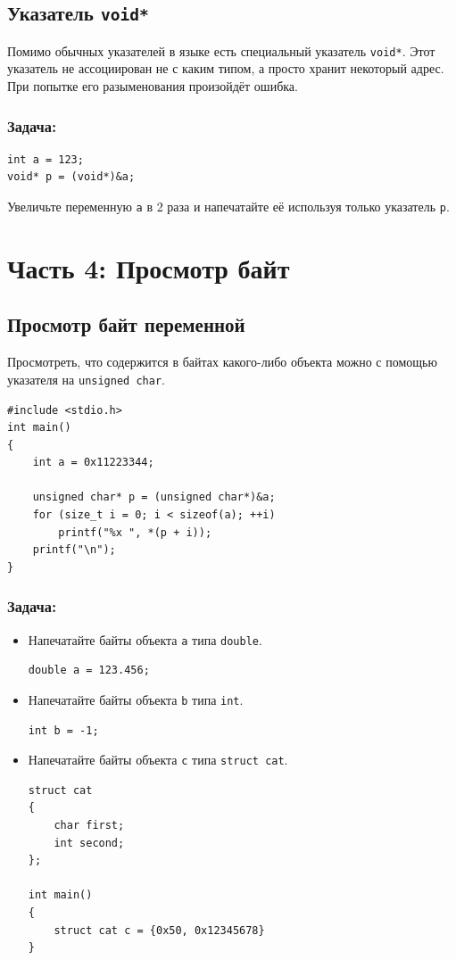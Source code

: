 \documentclass{article}
\begin{document}
\subsection*{Указатель \texttt{void*}}
Помимо обычных указателей в языке есть специальный указатель \texttt{void*}. Этот указатель не ассоциирован не с каким типом, а просто хранит некоторый адрес. При попытке его разыменования произойдёт ошибка.
\subsubsection*{Задача:}
\begin{lstlisting} 
int a = 123;
void* p = (void*)&a;
\end{lstlisting}
Увеличьте переменную \texttt{a} в 2 раза и напечатайте её используя только указатель \texttt{p}.


\newpage

\section*{Часть 4: Просмотр байт}
\subsection*{Просмотр байт переменной}
Просмотреть, что содержится в байтах какого-либо объекта можно с помощью указателя на \texttt{unsigned char}.

\begin{lstlisting} 
#include <stdio.h>
int main() 
{
    int a = 0x11223344;
    
    unsigned char* p = (unsigned char*)&a;
    for (size_t i = 0; i < sizeof(a); ++i)
        printf("%x ", *(p + i));
    printf("\n");
}
\end{lstlisting}

\subsubsection*{Задача:}

\begin{itemize}
\item Напечатайте байты объекта \texttt{a} типа \texttt{double}.
\begin{lstlisting} 
double a = 123.456;
\end{lstlisting}

\item Напечатайте байты объекта \texttt{b} типа \texttt{int}.
\begin{lstlisting} 
int b = -1;
\end{lstlisting}

\item Напечатайте байты объекта \texttt{c} типа \texttt{struct cat}.
\begin{lstlisting} 
struct cat
{
    char first;
    int second;
};

int main()
{
    struct cat c = {0x50, 0x12345678}
}

\end{lstlisting}


\end{itemize}
\end{document}
